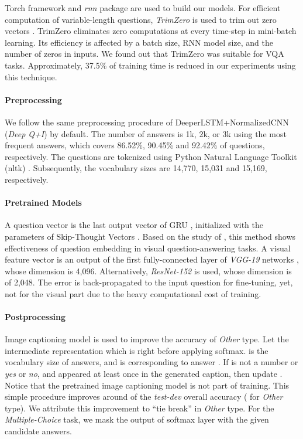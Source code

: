 \documentclass{article}
\begin{document}
Torch framework and \textit{rnn} package \cite{Leonard2015a} are used to build our models. For efficient computation of variable-length questions, \textit{TrimZero} is used to trim out zero vectors \cite{Kim2016a}. TrimZero eliminates zero computations at every time-step in mini-batch learning. Its efficiency is affected by a batch size, RNN model size, and the number of zeros in inputs. We found out that TrimZero was suitable for VQA tasks. Approximately, 37.5\% of training time is reduced in our experiments using this technique.

\paragraph{Preprocessing} We follow the same preprocessing procedure of DeeperLSTM+NormalizedCNN \cite{Lu2015} (\textit{Deep Q+I}) by default. The number of answers is 1k, 2k, or 3k using the most frequent answers, which covers 86.52\%, 90.45\% and 92.42\% of questions, respectively. The questions are tokenized using Python Natural Language Toolkit (nltk) \cite{Bird2009}. Subsequently, the vocabulary sizes are 14,770, 15,031 and 15,169, respectively.


\paragraph{Pretrained Models}

A question vector  is the last output vector of GRU \cite{Cho2014}, initialized with the parameters of Skip-Thought Vectors \cite{Kiros2015}. Based on the study of \citet{Noh2015}, this method shows effectiveness of question embedding in visual question-answering tasks. A visual feature vector  is an output of the first fully-connected layer of \textit{VGG-19} networks \cite{Simonyan2015}, whose dimension is 4,096. Alternatively, \textit{ResNet-152} \cite{He2015} is used, whose dimension is of 2,048. The error is back-propagated to the input question for fine-tuning, yet, not for the visual part  due to the heavy computational cost of training.

\paragraph{Postprocessing}

Image captioning model \cite{Karpathy} is used to improve the accuracy of \textit{Other} type. Let the intermediate representation  which is right before applying softmax.  is the vocabulary size of answers, and  is corresponding to answer . If  is not a number or \textit{yes} or \textit{no}, and appeared at least once in the generated caption, then update . Notice that the pretrained image captioning model is not part of training. This simple procedure improves around  of the \textit{test-dev} overall accuracy ( for \textit{Other} type). We attribute this improvement to ``tie break'' in \textit{Other} type. For the \textit{Multiple-Choice} task, we mask the output of softmax layer with the given candidate answers.
\end{document}
